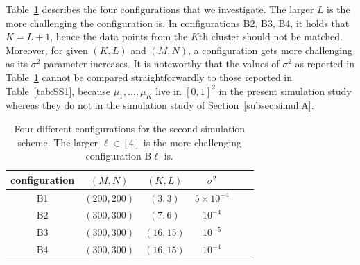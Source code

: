 Table~\ref{tab:SS2} describes the four configurations that we investigate. The
larger $L$  is the more  challenging the configuration is.   In configurations
B2, B3,  B4, it holds  that $K =  L+1$, hence the  data points from  the $K$th
cluster should  not be  matched. Moreover,  for given  $(K,L)$ and  $(M,N)$, a
configuration gets  more challenging as its  $\sigma^{2}$ parameter increases.
It   is  noteworthy   that  the   values  of   $\sigma^{2}$  as   reported  in
Table~\ref{tab:SS2} cannot be compared  straightforwardly to those reported in
Table~\ref{tab:SS1}, because $\mu_{1}, \ldots, \mu_{K}$ live in $[0,1]^{2}$ in
the present  simulation study whereas they  do not in the  simulation study of
Section~\ref{subsec:simul:A}.


\begin{table}[!ht]
\center
\begin{tabular}{|c | c|c |c |c|c} \hline  configuration & $ (M,N)$ & $(K,L)$ &
  $\sigma^{2}$ \\ \hline
  B1 &$(200, 200)$& $(3, 3)$ & $5\times 10^{-4}$\\
  B2  &$(300, 300)$& $(7,6)$ & $10^{-4}$ \\
  B3  &$(300, 300)$& $(16,15)$ & $10^{-5}$ \\
  B4 &$(300, 300)$& $(16,15)$ & $10^{-4}$ \\\hline
\end{tabular}
\caption{Four different  configurations for the second  simulation scheme. The
  larger  $\ell  \in  [4]$  is  the  more  challenging  configuration  B$\ell$
  is.}
 \label{tab:SS2}
\end{table}


